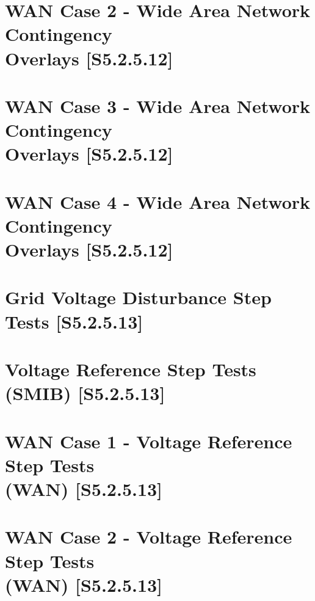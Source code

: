\documentclass{../grid-link-report}
\begin{document}
	\section{WAN Case 2 - Wide Area Network Contingency 
		\\
		Overlays [S5.2.5.12]}
	\label{WAN Case 2 - Wide Area Network Contingency Overlays [S5.2.5.12]}
	
	\section{WAN Case 3 - Wide Area Network Contingency 
		\\
		Overlays [S5.2.5.12]}
	\label{WAN Case 3 - Wide Area Network Contingency Overlays [S5.2.5.12]}
	
	\section{WAN Case 4 - Wide Area Network Contingency 
		\\
		Overlays [S5.2.5.12]}
	\label{WAN Case 4 - Wide Area Network Contingency Overlays [S5.2.5.12]}
	
	\section{Grid Voltage Disturbance Step Tests [S5.2.5.13]}
	\label{Grid Voltage Disturbance Step Tests [S5.2.5.13]}
	
	\section{Voltage Reference Step Tests (SMIB) [S5.2.5.13]}
	\label{Voltage Reference Step Tests (SMIB) [S5.2.5.13]}
	
	\section{WAN Case 1 - Voltage Reference Step Tests 
		\\
		(WAN) [S5.2.5.13]}
	\label{WAN Case 1 - Voltage Reference Step Tests (WAN) [S5.2.5.13]}
	
	\section{WAN Case 2 - Voltage Reference Step Tests 
		\\
		(WAN) [S5.2.5.13]}
	\label{WAN Case 2 - Voltage Reference Step Tests (WAN) [S5.2.5.13]}
	
\end{document}
